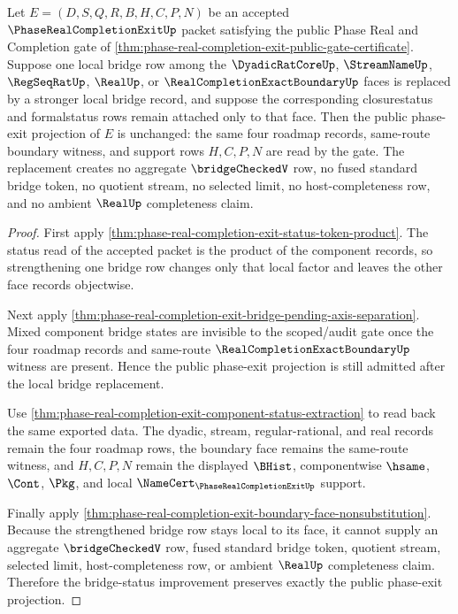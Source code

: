 \begin{theorem}
\label{thm:phase-real-completion-exit-component-bridge-upgrade-invariance}
Let $E=(D,S,Q,R,B,H,C,P,N)$ be an accepted $\PhaseRealCompletionExitUp$ packet satisfying the public Phase Real and Completion gate of \autoref{thm:phase-real-completion-exit-public-gate-certificate}. Suppose one local bridge row among the $\DyadicRatCoreUp$, $\StreamNameUp$, $\RegSeqRatUp$, $\RealUp$, or $\RealCompletionExactBoundaryUp$ faces is replaced by a stronger local bridge record, and suppose the corresponding closurestatus and formalstatus rows remain attached only to that face. Then the public phase-exit projection of $E$ is unchanged: the same four roadmap records, same-route boundary witness, and support rows $H,C,P,N$ are read by the gate. The replacement creates no aggregate $\bridgeCheckedV$ row, no fused standard bridge token, no quotient stream, no selected limit, no host-completeness row, and no ambient $\RealUp$ completeness claim.
\end{theorem}
\begin{proof}
First apply \autoref{thm:phase-real-completion-exit-status-token-product}. The status read of the accepted packet is the product of the component records, so strengthening one bridge row changes only that local factor and leaves the other face records objectwise.

Next apply \autoref{thm:phase-real-completion-exit-bridge-pending-axis-separation}. Mixed component bridge states are invisible to the scoped/audit gate once the four roadmap records and same-route $\RealCompletionExactBoundaryUp$ witness are present. Hence the public phase-exit projection is still admitted after the local bridge replacement.

Use \autoref{thm:phase-real-completion-exit-component-status-extraction} to read back the same exported data. The dyadic, stream, regular-rational, and real records remain the four roadmap rows, the boundary face remains the same-route witness, and $H,C,P,N$ remain the displayed $\BHist$, componentwise $\hsame$, $\Cont$, $\Pkg$, and local $\NameCert_{\PhaseRealCompletionExitUp}$ support.

Finally apply \autoref{thm:phase-real-completion-exit-boundary-face-nonsubstitution}. Because the strengthened bridge row stays local to its face, it cannot supply an aggregate $\bridgeCheckedV$ row, fused standard bridge token, quotient stream, selected limit, host-completeness row, or ambient $\RealUp$ completeness claim. Therefore the bridge-status improvement preserves exactly the public phase-exit projection.
\end{proof}

